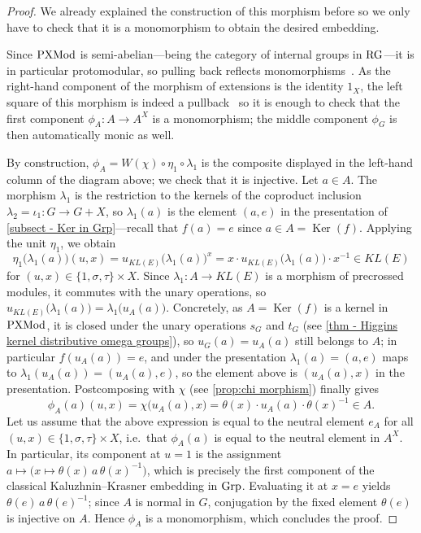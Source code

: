 \documentclass[a4paper, british, reqno]{amsart}
\newcommand*{\comp}{\circ}
\DeclareMathOperator{\Ker}{Ker} %
\newcommand*{\CatName}[1]{\textnormal{#1}}
\newcommand*{\Grp}{\CatName{Grp}}
\newcommand*{\PXMod}{\CatName{PXMod}}
\newcommand*{\RG}{\CatName{RG}}
\theoremstyle{definition}
\theoremstyle{remark}
\begin{document}
\begin{proof}
	We already explained the construction of this morphism before so we only have to check that it is a monomorphism to obtain the desired embedding.

	Since \(\PXMod\) is semi-abelian---being the category of internal groups in \(\RG\)---it is in particular protomodular, so pulling back reflects monomorphisms~\cite[Lemma~3.1.20]{BB04}. As the right-hand component of the morphism of extensions is the identity \(1_X\), the left square of this morphism is indeed a pullback~\cite[Lemma~4.2.4]{BB04} so it is enough to check that the first component \(\phi_A\colon A\to A^X\) is a monomorphism; the middle component \(\phi_G\) is then automatically monic as well.

	By construction, \(\phi_A=W(\chi)\comp \eta_1\comp \lambda_1\) is the composite displayed in the left-hand column of the diagram above; we check that it is injective. Let \(a\in A\). The morphism \(\lambda_1\) is the restriction to the kernels of the coproduct inclusion \(\lambda_2=\iota_1\colon G\to G+X\), so \(\lambda_1(a)\) is the element \((a,e)\) in the presentation of \cref{subsect - Ker in Grp}---recall that \(f(a)=e\) since \(a\in A=\Ker(f)\). Applying the unit \(\eta_1\), we obtain
	\[
		\eta_1\bigl(\lambda_1(a)\bigr)(u,x)=u_{KL(E)}\bigl(\lambda_1(a)\bigr)^x=x\cdot u_{KL(E)}\bigl(\lambda_1(a)\bigr)\cdot x^{-1}\in KL(E)
	\]
	for \((u,x)\in \{1,\sigma,\tau\}\times X\). Since \(\lambda_1\colon A\to KL(E)\) is a morphism of precrossed modules, it commutes with the unary operations, so \(u_{KL(E)}\bigl(\lambda_1(a)\bigr)=\lambda_1\bigl(u_A(a)\bigr)\). Concretely, as \(A=\Ker(f)\) is a kernel in \(\PXMod\), it is closed under the unary operations \(s_G\) and \(t_G\) (see \cref{thm - Higgins kernel distributive omega groups}), so \(u_G(a)=u_A(a)\) still belongs to \(A\); in particular \(f(u_A(a))=e\), and under the presentation \(\lambda_1(a)=(a,e)\) maps to \(\lambda_1(u_A(a))=(u_A(a),e)\), so the element above is \((u_A(a),x)\) in the presentation. Postcomposing with \(\chi\) (see \cref{prop:chi morphism}) finally gives
	\[
		\phi_A(a)(u,x)=\chi\bigl(u_A(a),x\bigr)=\theta(x)\cdot u_A(a)\cdot \theta(x)^{-1}\in A\text{.}
	\]
	Let us assume that the above expression is equal to the neutral element \(e_A\) for all \((u,x)\in \{1,\sigma,\tau\}\times X\), i.e.\ that \(\phi_A(a)\) is equal to the neutral element in \(A^X\). In particular, its component at \(u=1\) is the assignment \(a\mapsto \bigl(x\mapsto \theta(x)\, a\, \theta(x)^{-1}\bigr)\), which is precisely the first component of the classical Kaluzhnin--Krasner embedding in \(\Grp\). Evaluating it at \(x=e\) yields \(\theta(e)\, a\, \theta(e)^{-1}\); since \(A\) is normal in \(G\), conjugation by the fixed element \(\theta(e)\) is injective on \(A\). Hence \(\phi_A\) is a monomorphism, which concludes the proof.
\end{proof}
\end{document}
